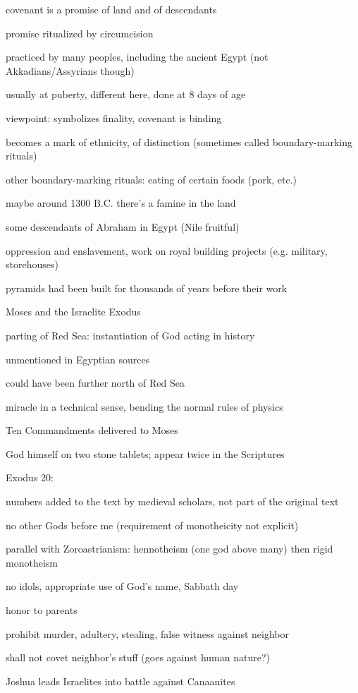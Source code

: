 \documentclass[12pt]{article}
\begin{document}
covenant is a promise of land and of descendants

\noindent
promise ritualized by circumcision

practiced by many peoples, including the ancient Egypt (not Akkadians/Assyrians though)

usually at puberty, different here, done at 8 days of age

viewpoint: symbolizes finality, covenant is binding

becomes a mark of ethnicity, of distinction (sometimes called boundary-marking rituals)

other boundary-marking rituals: eating of certain foods (pork, etc.)

\noindent
maybe around 1300 B.C. there's a famine in the land

some descendants of Abraham in Egypt (Nile fruitful)

oppression and enslavement, work on royal building projects (e.g. military, storehouses)

pyramids had been built for thousands of years before their work

\noindent
Moses and the Israelite Exodus

parting of Red Sea: instantiation of God acting in history

unmentioned in Egyptian sources

could have been further north of Red Sea

miracle in a technical sense, bending the normal rules of physics

Ten Commandments delivered to Moses

God himself on two stone tablets; appear twice in the Scriptures

\noindent
Exodus 20:

numbers added to the text by medieval scholars, not part of the original text

no other Gods before me (requirement of monotheicity not explicit)

parallel with Zoroastrianism: hennotheism (one god above many) then rigid monotheism

no idols, appropriate use of God's name, Sabbath day

honor to parents

prohibit murder, adultery, stealing, false witness against neighbor

shall not covet neighbor's stuff (goes against human nature?)

\noindent
Joshua leads Israelites into battle against Canaanites
\end{document}
